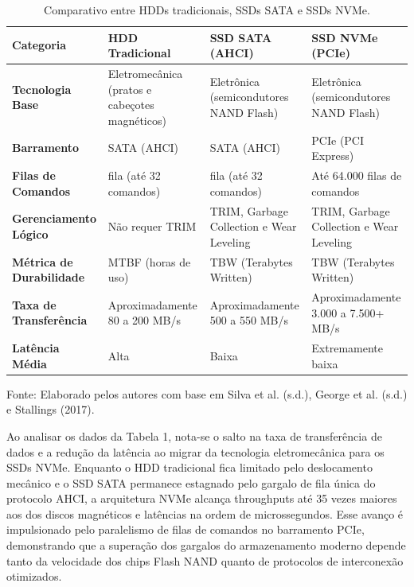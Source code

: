 \documentclass[12pt]{article}
\begin{document}
\begin{table}[H]
\vspace{-6pt}
\centering
\caption{Comparativo entre HDDs tradicionais, SSDs SATA e SSDs NVMe.}
\label{tab:comparativo-armazenamento}
\small
\renewcommand{\arraystretch}{1.25}

\begin{tabularx}{\linewidth}{
|>{\raggedright\arraybackslash}p{2.5cm}
|>{\raggedright\arraybackslash}X
|>{\raggedright\arraybackslash}X
|>{\raggedright\arraybackslash}X|}
\hline
\textbf{Categoria} &
\textbf{HDD Tradicional} &
\textbf{SSD SATA (AHCI)} &
\textbf{SSD NVMe (PCIe)} \\
\hline

\textbf{Tecnologia Base} &
Eletromecânica (pratos e cabeçotes magnéticos) &
Eletrônica (semicondutores NAND Flash) &
Eletrônica (semicondutores NAND Flash) \\
\hline

\textbf{Barramento} &
SATA (AHCI) &
SATA (AHCI) &
PCIe (PCI Express) \\
\hline

\textbf{Filas de Comandos} &
1 fila (até 32 comandos) &
1 fila (até 32 comandos) &
Até 64.000 filas de comandos \\
\hline

\textbf{Gerenciamento Lógico} &
Não requer TRIM &
TRIM, Garbage Collection e Wear Leveling &
TRIM, Garbage Collection e Wear Leveling \\
\hline

\textbf{Métrica de Durabilidade} &
MTBF (horas de uso) &
TBW (Terabytes Written) &
TBW (Terabytes Written) \\
\hline

\textbf{Taxa de Transferência} &
Aproximadamente 80 a 200 MB/s &
Aproximadamente 500 a 550 MB/s &
Aproximadamente 3.000 a 7.500+ MB/s \\
\hline

\textbf{Latência Média} &
Alta &
Baixa &
Extremamente baixa \\
\hline
\end{tabularx}

\vspace{2mm}
\begin{flushleft}
\footnotesize
Fonte: Elaborado pelos autores com base em Silva et al. (s.d.),
George et al. (s.d.) e Stallings (2017).
\end{flushleft}
\end{table}

Ao analisar os dados da Tabela 1, nota-se o salto na taxa de transferência de dados e a redução da latência ao migrar da tecnologia eletromecânica para os SSDs NVMe. Enquanto o HDD tradicional fica limitado pelo deslocamento mecânico e o SSD SATA permanece estagnado pelo gargalo de fila única do protocolo AHCI, a arquitetura NVMe alcança throughputs até 35 vezes maiores aos dos discos magnéticos e latências na ordem de microssegundos. Esse avanço é impulsionado pelo paralelismo de filas de comandos no barramento PCIe, demonstrando que a superação dos gargalos do armazenamento moderno depende tanto da velocidade dos chips Flash NAND quanto de protocolos de interconexão otimizados.
\end{document}
